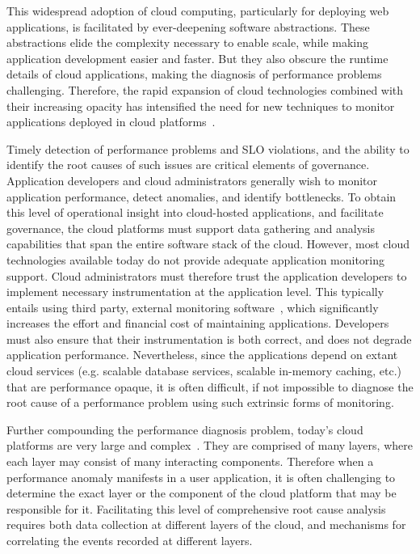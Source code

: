 This widespread adoption of cloud computing, particularly for deploying
web applications, is facilitated by ever-deepening software abstractions.
These abstractions elide the complexity necessary to enable scale, while
making application development easier and faster.
But they also obscure the runtime details of cloud applications, 
making the diagnosis of performance problems challenging. 
Therefore, the rapid expansion of cloud technologies
combined with their increasing opacity has intensified the need 
for new techniques to
monitor applications deployed in cloud platforms~\cite{DaCunhaRodrigues:2016:MCC:2851613.2851619}. 

Timely detection
of performance problems and SLO violations, and the ability to identify the root causes
of such issues are critical elements of governance.
Application developers and cloud administrators generally wish to monitor 
application performance, detect anomalies, and identify bottlenecks. To obtain 
this level of operational insight into cloud-hosted applications, 
and facilitate governance, the cloud platforms must support 
data gathering and analysis capabilities that span the entire software stack of the cloud. 
However, most cloud technologies available
today do not provide adequate application monitoring support. 
Cloud administrators must therefore trust the
application developers to implement necessary instrumentation 
at the application level. This typically entails using third party, external monitoring software~\cite{newrelic,dynatrace,datadog},
which significantly increases the effort and financial cost of maintaining applications.
Developers must also ensure
that their instrumentation is both correct, and does not degrade 
application performance.  Nevertheless, since the applications depend on extant
cloud services (e.g. scalable database services, 
scalable in-memory caching, etc.) that are performance opaque, it is
often difficult, if not impossible to diagnose the root cause of a performance problem
using such extrinsic forms of monitoring.

Further compounding the performance
diagnosis problem, today's cloud platforms are very 
large and complex~\cite{DaCunhaRodrigues:2016:MCC:2851613.2851619,Ibidunmoye:2015:PAD:2808687.2791120}. 
They are
comprised of many layers, where each layer may consist of many interacting components.
Therefore when a performance anomaly manifests in a user application, it is
often challenging
to determine the exact layer or the component of the cloud platform that may be responsible for it. 
Facilitating this level of comprehensive root cause analysis requires
both data collection at different layers of the cloud, and mechanisms for correlating 
the events recorded at different layers. 

